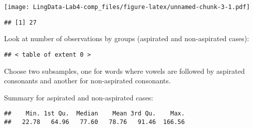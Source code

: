 \documentclass[]{article}
\newenvironment{Shaded}{\begin{snugshade}}{\end{snugshade}}
\newcommand{\KeywordTok}[1]{\textcolor[rgb]{0.13,0.29,0.53}{\textbf{#1}}}
\newcommand{\StringTok}[1]{\textcolor[rgb]{0.31,0.60,0.02}{#1}}
\newcommand{\OperatorTok}[1]{\textcolor[rgb]{0.81,0.36,0.00}{\textbf{#1}}}
\newcommand{\NormalTok}[1]{#1}
\begin{document}
\texttt{[image: LingData-Lab4-comp\_files/figure-latex/unnamed-chunk-3-1.pdf]}

\begin{verbatim}
## [1] 27
\end{verbatim}

Look at number of observations by groups (aspirated and non-aspirated
cases):

\begin{Shaded}
\end{Shaded}

\begin{verbatim}
## < table of extent 0 >
\end{verbatim}

Choose two subsamples, one for words where vowels are followed by
aspirated consonants and another for non-aspirated consonants.

\begin{Shaded}
\end{Shaded}

Summary for aspirated and non-aspirated cases:

\begin{Shaded}
\end{Shaded}

\begin{verbatim}
##    Min. 1st Qu.  Median    Mean 3rd Qu.    Max. 
##   22.78   64.96   77.60   78.76   91.46  166.56
\end{verbatim}

\begin{Shaded}
\end{Shaded}
\end{document}
